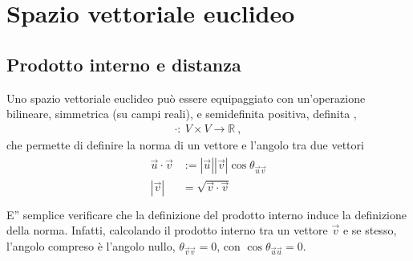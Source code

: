 \documentclass[letterpaper,10pt,italian]{jupyterBook}
\begin{document}
\section{Spazio vettoriale euclideo}
\label{\detokenize{ch/algebra/vector-algebra-euclidean-space:spazio-vettoriale-euclideo}}\label{\detokenize{ch/algebra/vector-algebra-euclidean-space:math-hs-algebra-vector-euclidean-space}}\label{\detokenize{ch/algebra/vector-algebra-euclidean-space::doc}}
\sphinxAtStartPar
{}

\sphinxAtStartPar
{}


\subsection{Prodotto interno e distanza}
\label{\detokenize{ch/algebra/vector-algebra-euclidean-space:prodotto-interno-e-distanza}}\label{\detokenize{ch/algebra/vector-algebra-euclidean-space:math-hs-algebra-vector-euclidean-space-inner-product}}
\sphinxAtStartPar
Uno spazio vettoriale euclideo può essere equipaggiato con un’operazione bilineare, simmetrica (su campi reali), e semi\sphinxhyphen{}definita positiva, definita ,
\begin{equation*}
\begin{split}\cdot: \ V \times V \rightarrow \mathbb{R} \ ,\end{split}
\end{equation*}
\sphinxAtStartPar
che permette di definire la norma di un vettore e l’angolo tra due vettori
\begin{equation*}
\begin{split}\begin{aligned}
  \vec{u} \cdot \vec{v} & := |\vec{u}||\vec{v}| \cos \theta_{\vec{u} \vec{v}}  \\
              |\vec{v}| & = \sqrt{\vec{v} \cdot \vec{v}}  \\
\end{aligned}\end{split}
\end{equation*}
\sphinxAtStartPar
E” semplice verificare che la definizione del prodotto interno induce la definizione della norma. Infatti, calcolando il prodotto interno tra un vettore \(\vec{v}\) e se stesso, l’angolo compreso è l’angolo nullo, \(\theta_{\vec{v} \vec{v}} = 0\), con \(\cos \theta_{\vec{u}\vec{u}} = 0\).
\end{document}
